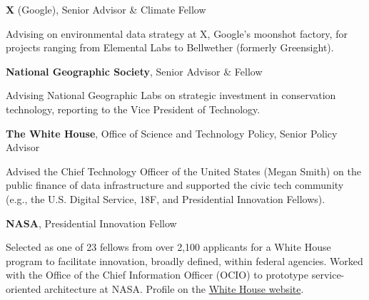 \documentclass[10pt,letterpaper]{article}
\renewenvironment{itemize}{
  \begin{list}{}{
    \setlength{\leftmargin}{1.5em}
    \setlength{\itemsep}{0.25em}
    \setlength{\parskip}{0pt}
    \setlength{\parsep}{0.25em}
  }
}{
  \end{list}
}
\begin{document}
\begin{itemize}
\item \textbf{X} (Google), Senior Advisor \& Climate Fellow
  \begin{itemize}
  \item Advising on environmental data strategy at X, Google's moonshot factory, for projects ranging from Elemental Labs to Bellwether (formerly Greensight).
  \end{itemize}

\item \textbf{National Geographic Society}, Senior Advisor \& Fellow
  \begin{itemize}
  \item Advising National Geographic Labs on strategic investment in conservation technology, reporting to the Vice President of Technology.
  \end{itemize}

\item \textbf{The White House}, Office of Science and Technology Policy, Senior Policy Advisor
  \begin{itemize}
  \item Advised the Chief Technology Officer of the United States (Megan Smith) on the public finance of data infrastructure and supported the civic tech community (e.g., the U.S. Digital Service, 18F, and Presidential Innovation Fellows).
  \end{itemize}


\item \textbf{NASA}, Presidential Innovation Fellow
  \begin{itemize}
  \item Selected as one of 23 fellows from over 2,100 applicants for a White House program to facilitate innovation, broadly defined, within federal agencies. Worked with the Office of the Chief Information Officer (OCIO) to prototype service-oriented architecture at NASA. Profile on the \href{http://www.whitehouse.gov/innovationfellows}{White House website}.
  \end{itemize}


\end{itemize}
\end{document}
